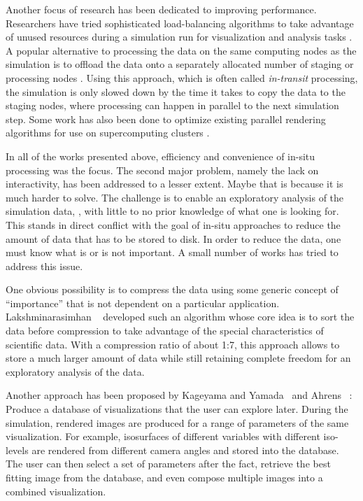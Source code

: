 %
Another focus of research has been dedicated to improving performance.
%
Researchers have tried sophisticated load-balancing algorithms to take advantage
of unused resources during a simulation run for visualization and analysis tasks
\cite{Zheng2013}.
%
A popular alternative to processing the data on the same computing nodes as the
simulation is to offload the data onto a separately allocated number of staging
or processing
nodes \cite{Zheng2010,Abbasi2010,Abbasi2011,Docan2011,Docan2012,Bennett2012}.
%
Using this approach, which is often called \emph{in-transit} processing, the
simulation is only slowed down by the time it takes to copy the data to the
staging nodes, where processing can happen in parallel to the next simulation
step.
%
Some work has also been done to optimize existing parallel rendering algorithms
for use on supercomputing
clusters \cite{Yu2008,Kendall2010,Moreland2011a,Cavin2012,Nonaka2014,Grosset2016}.
%

%
In all of the works presented above, efficiency and convenience of in-situ
processing was the focus.
%
The second major problem, namely the lack on interactivity, has been addressed
to a lesser extent.
%
Maybe that is because it is much harder to solve.
%
The challenge is to enable an exploratory analysis of the simulation data, \ie{},
with little to no prior knowledge of what one is looking for.
%
This stands in direct conflict with the goal of in-situ approaches to reduce the
amount of data that has to be stored to disk.
%
In order to reduce the data, one must know what is or is not important.
%
A small number of works has tried to address this issue.
%

%
One obvious possibility is to compress the data using some generic concept of
``importance'' that is not dependent on a particular application.
%
Lakshminarasimhan \etal{}~\cite{Lakshminarasimhan2011} developed such an algorithm
whose core idea is to sort the data before compression to take advantage of the
special characteristics of scientific data.
%
With a compression ratio of about 1:7, this approach allows to store a much larger
amount of data while still retaining complete freedom for an exploratory
analysis of the data.
%

%
Another approach has been proposed by Kageyama and Yamada~\cite{Kageyama2014}
and Ahrens \etal{}~\cite{Ahrens2014}:
%
Produce a database of visualizations that the user can explore later.
%
During the simulation, rendered images are produced for a range of parameters
of the same visualization.
%
For example, isosurfaces of different variables with different iso-levels are
rendered from different camera angles and stored into the database.
%
The user can then select a set of parameters after the fact, retrieve the
best fitting image from the database, and even compose multiple images into
a combined visualization.
%

